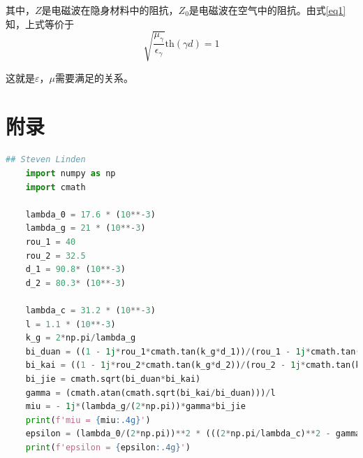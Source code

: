 \documentclass[a4paper]{article}
\begin{document}
其中，$Z$是电磁波在隐身材料中的阻抗，$Z_0$是电磁波在空气中的阻抗。由式\ref{eq1} 知，上式等价于
\begin{equation}
	\sqrt{\frac{\mu_\gamma}{\epsilon_\gamma}}\text{th}(\gamma d) = 1
\end{equation}

这就是$\varepsilon$，$\mu$需要满足的关系。

\section{附录}
\begin{lstlisting}[style=mystyle, language=Python, caption={数据处理代码}, label={lst:python_example}]
	## Steven Linden
	import numpy as np
	import cmath
	
	lambda_0 = 17.6 * (10**-3)
	lambda_g = 21 * (10**-3)
	rou_1 = 40
	rou_2 = 32.5
	d_1 = 90.8* (10**-3)
	d_2 = 80.3* (10**-3)

	lambda_c = 31.2 * (10**-3)
	l = 1.1 * (10**-3)
	k_g = 2*np.pi/lambda_g
	bi_duan = ((1 - 1j*rou_1*cmath.tan(k_g*d_1))/(rou_1 - 1j*cmath.tan(k_g*d_1)))
	bi_kai = ((1 - 1j*rou_2*cmath.tan(k_g*d_2))/(rou_2 - 1j*cmath.tan(k_g*d_2)))
	bi_jie = cmath.sqrt(bi_duan*bi_kai)
	gamma = (cmath.atan(cmath.sqrt(bi_kai/bi_duan)))/l
	miu = - 1j*(lambda_g/(2*np.pi))*gamma*bi_jie
	print(f'miu = {miu:.4g}')
	epsilon = (lambda_0/(2*np.pi))**2 * (((2*np.pi/lambda_c)**2 - gamma**2)/miu)
	print(f'epsilon = {epsilon:.4g}')
\end{lstlisting}

\nocite{jiaocai}

\end{document}
